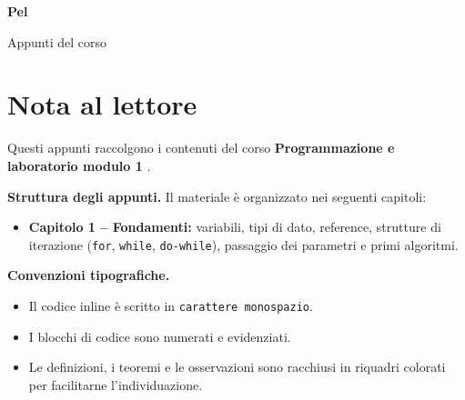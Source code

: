 \documentclass[a4paper,12pt,twoside]{book}
\newcommand{\inlinecode}[1]{\texttt{\textcolor{codeblue}{#1}}}
\begin{document}
\begin{titlepage}
    \vspace*{\fill}
    \centering
    {\Huge \textbf{Pel}\par}
    \vspace{1.5cm}
    {\Large Appunti del corso\par}
    \vspace{1cm}
    \vspace*{\fill}
\end{titlepage}

\newpage

\chapter*{Nota al lettore }

Questi appunti raccolgono i contenuti del corso  \textbf{Programmazione  e laboratorio modulo 1 }. 



\vspace{0.5cm}
\noindent\textbf{Struttura degli appunti.} Il materiale è organizzato nei seguenti capitoli:

\begin{itemize}
    \item \textbf{Capitolo 1 -- Fondamenti:} variabili, tipi di dato, reference, strutture di iterazione (\inlinecode{for}, \inlinecode{while}, \inlinecode{do-while}), passaggio dei parametri e primi algoritmi.
\end{itemize}

\vspace{0.5cm}
\noindent\textbf{Convenzioni tipografiche.}
\begin{itemize}
    \item Il codice inline è scritto in \inlinecode{carattere monospazio}.
    \item I blocchi di codice sono numerati e evidenziati.
    \item Le definizioni, i teoremi e le osservazioni sono racchiusi in riquadri colorati per facilitarne l'individuazione.
\end{itemize}
\end{document}

